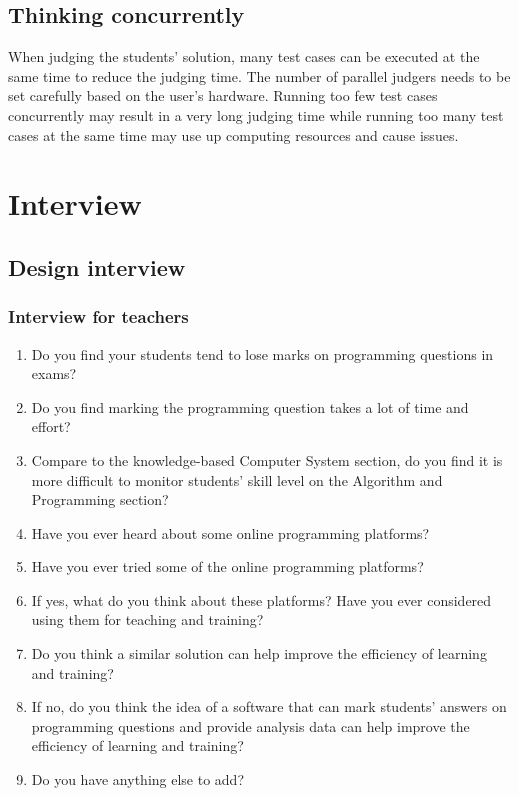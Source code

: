 \documentclass[a4paper]{report}
\begin{document}
\subsection{Thinking concurrently}

When judging the students' solution, many test cases can be executed at the same time to reduce the judging time. The number of parallel judgers needs to be set carefully based on the user's hardware. Running too few test cases concurrently may result in a very long judging time while running too many test cases at the same time may use up computing resources and cause issues.

\section{Interview}

\subsection{Design interview}

\subsubsection{Interview for teachers}

\begin{enumerate}
    \item Do you find your students tend to lose marks on programming questions in exams?
    \item Do you find marking the programming question takes a lot of time and effort?
    \item Compare to the knowledge-based Computer System section, do you find it is more difficult to monitor students' skill level on the Algorithm and Programming section?
    \item Have you ever heard about some online programming platforms?
    \item Have you ever tried some of the online programming platforms?
    \item If yes, what do you think about these platforms? Have you ever considered using them for teaching and training?
    \item Do you think a similar solution can help improve the efficiency of learning and training?
    \item If no, do you think the idea of a software that can mark students' answers on programming questions and provide analysis data can help improve the efficiency of learning and training?
    \item Do you have anything else to add?
\end{enumerate}
\end{document}
